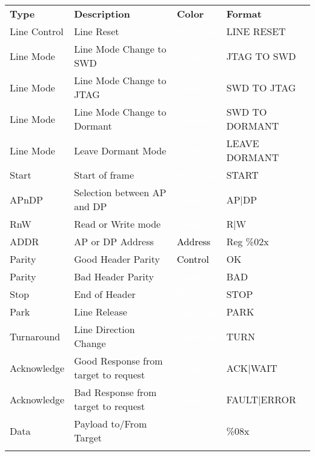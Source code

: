 \begin{tabularx}{16cm}{lllX}
\thickhline
\textbf{Type} & \textbf{Description} & \textbf{Color} & \textbf{Format} \\
\thickhline
Line Control & Line Reset & \cellcolor{preamble}\textcolor{white}{Preamble} & LINE RESET \\
\thinhline
Line Mode & Line Mode Change to SWD & \cellcolor{control}\textcolor{white}{Control} & JTAG TO SWD \\
\thinhline
Line Mode & Line Mode Change to JTAG & \cellcolor{control}\textcolor{white}{Control} & SWD TO JTAG \\
\thinhline
Line Mode & Line Mode Change to Dormant & \cellcolor{control}\textcolor{white}{Control} & SWD TO DORMANT \\
\thinhline
Line Mode & Leave Dormant Mode & \cellcolor{control}\textcolor{white}{Control} & LEAVE DORMANT \\
\thinhline
Start & Start of frame & \cellcolor{preamble}\textcolor{white}{Preamble} & START \\
\thinhline
APnDP & Selection between AP and DP & \cellcolor{control}\textcolor{white}{Control} & AP|DP  \\
\thinhline
RnW & Read or Write mode & \cellcolor{control}\textcolor{white}{Control} & R|W  \\
\thinhline
ADDR & AP or DP Address & \cellcolor{address}\textcolor{black}{Address} & Reg \%02x \\
\thinhline
Parity & Good Header Parity & \cellcolor{green}\textcolor{black}{Control} & OK  \\
\thinhline
Parity & Bad Header Parity & \cellcolor{red}\textcolor{white}{Control} & BAD  \\
\thinhline
Stop & End of Header & \cellcolor{preamble}\textcolor{white}{Preamble} & STOP \\
\thinhline
Park & Line Release & \cellcolor{preamble}\textcolor{white}{Preamble} & PARK \\
\thinhline
Turnaround & Line Direction Change & \cellcolor{preamble}\textcolor{white}{Preamble} & TURN \\
\thinhline
Acknowledge & Good Response from target to request & \cellcolor{control}\textcolor{white}{Control} & ACK|WAIT    \\
\thinhline
Acknowledge & Bad Response from target to request & \cellcolor{control}\textcolor{white}{Control} & FAULT|ERROR    \\
\thinhline
Data & Payload to/From Target & \cellcolor{data}\textcolor{white}{Data} & \%08x \\
\thinhline

\thickhline
\end{tabularx}

